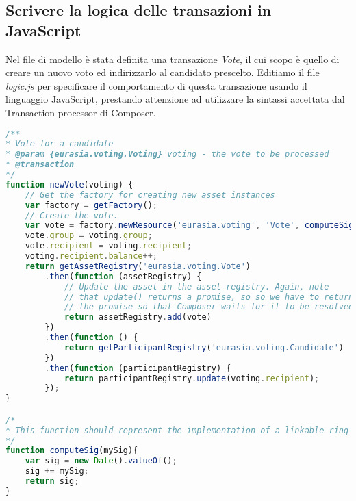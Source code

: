 	\subsection{Scrivere la logica delle transazioni in JavaScript}
		Nel file di modello è stata definita una transazione \emph{Vote}, il cui scopo è quello di creare un nuovo voto ed indirizzarlo al candidato prescelto. Editiamo il file \emph{logic.js} per specificare il comportamento di questa transazione usando il linguaggio JavaScript, prestando attenzione ad utilizzare la sintassi accettata dal Transaction processor di Composer.
\begin{lstlisting}[language=JavaScript]
/**
* Vote for a candidate
* @param {eurasia.voting.Voting} voting - the vote to be processed
* @transaction
*/
function newVote(voting) {	
	// Get the factory for creating new asset instances
	var factory = getFactory();
	// Create the vote.
	var vote = factory.newResource('eurasia.voting', 'Vote', computeSig(voting.signature));
	vote.group = voting.group;
	vote.recipient = voting.recipient;
	voting.recipient.balance++;
	return getAssetRegistry('eurasia.voting.Vote')
		.then(function (assetRegistry) {
			// Update the asset in the asset registry. Again, note
			// that update() returns a promise, so so we have to return
			// the promise so that Composer waits for it to be resolved.
			return assetRegistry.add(vote)
		})
		.then(function () {
			return getParticipantRegistry('eurasia.voting.Candidate')
		})
		.then(function (participantRegistry) {
			return participantRegistry.update(voting.recipient);
		});
}

/*
* This function should represent the implementation of a linkable ring signature algorythm. In this PoC it will return a simple timestamp + an arbitrary id
*/
function computeSig(mySig){
	var sig = new Date().valueOf();
	sig += mySig;
	return sig;
}

\end{lstlisting}
